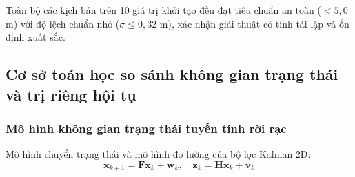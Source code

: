 \begin{table}[H]
\centering
\caption{Thống kê sai số RMSE trung bình và độ lệch chuẩn trên 10 giá trị khởi tạo (Seeds 1 đến 10)}
\label{tab:multiseed}
\end{table}

Toàn bộ các kịch bản trên 10 giá trị khởi tạo đều đạt tiêu chuẩn an toàn ($< 5{,}0$ m) với độ lệch chuẩn nhỏ ($\sigma \le 0{,}32$ m), xác nhận giải thuật có tính tái lập và ổn định xuất sắc.

\subsection{Cơ sở toán học so sánh không gian trạng thái và trị riêng hội tụ}

\subsubsection{Mô hình không gian trạng thái tuyến tính rời rạc}

\hspace{0.5cm} Mô hình chuyển trạng thái và mô hình đo lường của bộ lọc Kalman 2D:
\begin{equation}
\mathbf{x}_{k+1} = \mathbf{F} \mathbf{x}_k + \mathbf{w}_k, \quad \mathbf{z}_k = \mathbf{H} \mathbf{x}_k + \mathbf{v}_k
\label{eq:kalman-state-space-equations}
\end{equation}

